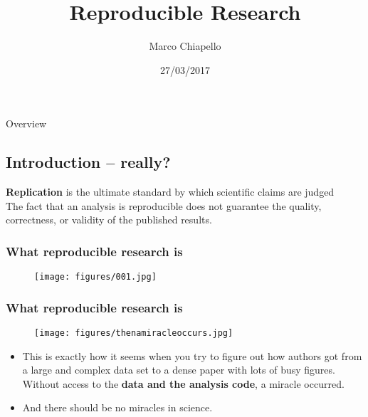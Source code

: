 \documentclass{beamer}
\title[Short title]{Reproducible Research}
\author{Marco Chiapello}
\institute[Center for Proteomics] 
{
Center for Proteomics\\
University of Cambridge \\ 
\medskip
\textit{mc983@cam.ac.uk} 
}
\date{27/03/2017}
\begin{document}
\begin{frame}
\titlepage 
\end{frame}

\begin{frame}{Overview}
\small
\tableofcontents
\end{frame}


\begin{frame}
\section{Introduction -- really?} 
\vspace{50px}
\begin{flushright}
\scriptsize {\bf Replication} is the ultimate standard by which scientific claims are judged \citep{Peng:2011et}\\
\scriptsize The fact that an analysis is reproducible does not guarantee the quality, correctness, or validity of the published results. 
\end{flushright}
\end{frame}

\begin{frame}
\frametitle{What reproducible research is}
\begin{figure}
\texttt{[image: figures/001.jpg]}
\end{figure}
\end{frame}

\begin{frame}
\frametitle{What reproducible research is}
\begin{figure}
\texttt{[image: figures/thenamiracleoccurs.jpg]}
\end{figure}
\footnotesize
\begin{itemize}
	\item This is exactly how it seems when you try to figure out how authors got from a large and complex data set to a dense paper with lots of busy figures. \\Without access to the \textbf{data and the analysis code}, a miracle occurred.
\item And  there should be {\sc no miracles in science.} \citep{Markowetz:2016cs}
\end{itemize}
\end{frame}
\end{document}
